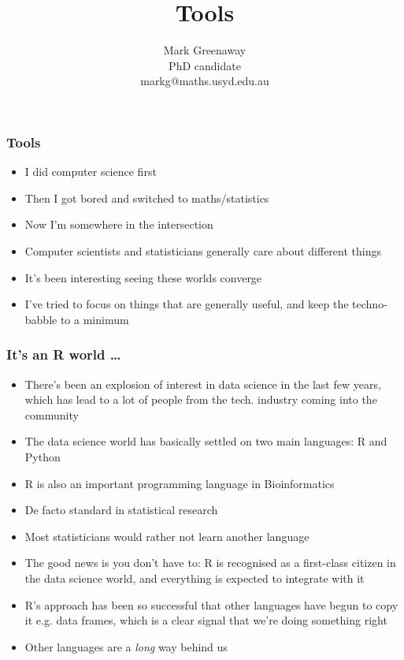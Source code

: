 \documentclass{beamer}
\title{Tools}
\author{Mark Greenaway\\PhD candidate\\markg@maths.usyd.edu.au}
\begin{document}
\begin{frame}
\titlepage
\end{frame}

\begin{frame}
\frametitle{Tools}
\begin{itemize}
\item I did computer science first
\item Then I got bored and switched to maths/statistics
\item Now I'm somewhere in the intersection
\item Computer scientists and statisticians generally care about different things
\item It's been interesting seeing these worlds converge
\item I've tried to focus on things that are generally useful, and keep the techno-babble to a
			minimum
\end{itemize}
\end{frame}

\begin{frame}
\frametitle{It's an R world \ldots}
\begin{itemize}
\item There's been an explosion of interest in data science in the last few years, which has 
			lead to a lot of people from the tech. industry coming into the community
\item The data science world has basically settled on two main languages: R and Python
\item R is also an important programming language in Bioinformatics
\item De facto standard in statistical research
\item Most statisticians would rather not learn another language
\item The good news is you don't have to: R is recognised as a first-class citizen in the data
			science world, and everything is expected to integrate with it
\item R's approach has been so successful that other languages have begun to copy it e.g. 					data frames, which is a clear signal that we're doing something right
\item Other languages are a \emph{long} way behind us
\end{itemize}
\end{frame}
\end{document}
